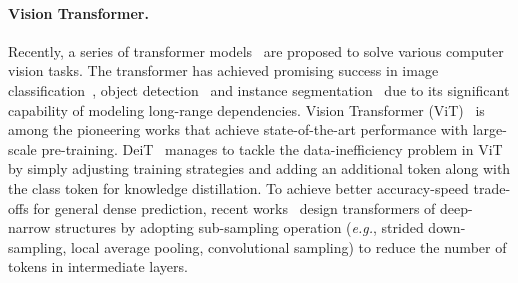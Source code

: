 \documentclass[letterpaper]{article} \usepackage{aaai22}  \usepackage{times}  \usepackage{helvet}  \usepackage{courier}  \usepackage[hyphens]{url}  \usepackage{graphicx} \urlstyle{rm} \def\UrlFont{\rm}  \usepackage{natbib}  \usepackage{caption} \DeclareCaptionStyle{ruled}{labelfont=normalfont,labelsep=colon,strut=off} \frenchspacing  \setlength{\pdfpagewidth}{8.5in}  \setlength{\pdfpageheight}{11in}  \usepackage{algorithm}
\begin{document}
\paragraph{Vision Transformer.}
Recently, a series of transformer models~\cite{survey1,survey4} are proposed to solve various computer vision tasks. The transformer has achieved promising success in image classification~\cite{ViT,DeiT,ConViT}, object detection~\cite{DETR,SwinT,deformableDETR} and instance segmentation~\cite{sstvos,SETR} due to its significant capability of modeling long-range dependencies. 
Vision Transformer (ViT)~\cite{ViT} is among the pioneering works that achieve state-of-the-art performance with large-scale pre-training. DeiT~\cite{DeiT} manages to tackle the data-inefficiency problem in ViT by simply adjusting training strategies and adding an additional token along with the class token for knowledge distillation. 
To achieve better accuracy-speed trade-offs for general dense prediction, recent works~\cite{T2T,LeViT,PVT} design transformers of deep-narrow structures by adopting sub-sampling operation (\emph{e.g.}, strided down-sampling, local average pooling, convolutional sampling) to reduce the number of tokens in intermediate layers.
\end{document}
